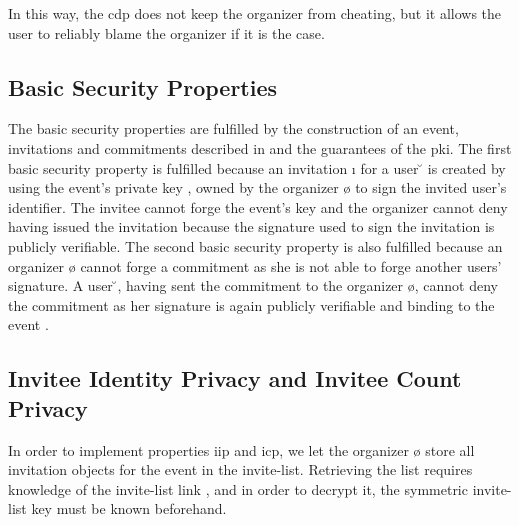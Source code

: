 \noindent In this way, the \acl{cdp} does not keep the organizer
from cheating, but it allows the user to reliably blame the organizer %
if it is the case.


\subsection{Basic Security Properties}
	\label{subsection:event-invitations-dosns:basic-security-properties}
The basic security properties are fulfilled by the construction of an event, invitations 
and commitments described in  and the guarantees 
of the \Ac{pki}. 
%
The first basic security property is fulfilled because an invitation \i{} for a user \u{} 
is created by using the event's private key \eS{}, owned by the organizer \o{} to 
sign the invited user's identifier. The invitee cannot forge the event's key and 
the organizer cannot deny having issued the invitation because 
the signature used to sign the invitation is publicly verifiable.
%
The second basic security property is also fulfilled because an organizer \o{} cannot forge 
a commitment \cm{} as she is not able to forge another users' signature. A %
user \u{}, having sent the commitment \cm{} to the organizer \o{}, cannot deny the 
commitment as her signature is again publicly verifiable and binding to the event \e{}.

\subsection{Invitee Identity Privacy and Invitee Count Privacy}
	\label{subsection:event-invitations-dosns:invitee-identity-and-count-privacy-properties}
In order to implement properties \Ac{iip} and \Ac{icp}, we let the organizer \o{} 
store all invitation objects for the event in the invite-list. 
Retrieving the list requires knowledge of the invite-list link \ILL{}, 
and in order to decrypt it, the symmetric invite-list key \ILK{} must be known 
beforehand.

